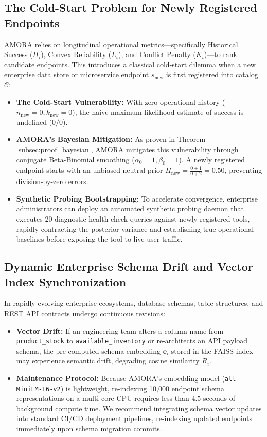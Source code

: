 \subsection{The Cold-Start Problem for Newly Registered Endpoints}
AMORA relies on longitudinal operational metrics---specifically Historical Success ($H_i$), Convex Reliability ($L_i$), and Conflict Penalty ($K_i$)---to rank candidate endpoints. This introduces a classical cold-start dilemma when a new enterprise data store or microservice endpoint $s_{\text{new}}$ is first registered into catalog $\mathcal{C}$:
\begin{itemize}
    \item \textbf{The Cold-Start Vulnerability:} With zero operational history ($n_{\text{new}} = 0, k_{\text{new}} = 0$), the naive maximum-likelihood estimate of success is undefined ($0/0$).
    \item \textbf{AMORA's Bayesian Mitigation:} As proven in Theorem \ref{subsec:proof_bayesian}, AMORA mitigates this vulnerability through conjugate Beta-Binomial smoothing ($\alpha_0 = 1, \beta_0 = 1$). A newly registered endpoint starts with an unbiased neutral prior $H_{\text{new}} = \frac{0 + 1}{0 + 2} = 0.50$, preventing division-by-zero errors.
    \item \textbf{Synthetic Probing Bootstrapping:} To accelerate convergence, enterprise administrators can deploy an automated synthetic probing daemon that executes 20 diagnostic health-check queries against newly registered tools, rapidly contracting the posterior variance and establishing true operational baselines before exposing the tool to live user traffic.
\end{itemize}

\subsection{Dynamic Enterprise Schema Drift and Vector Index Synchronization}
In rapidly evolving enterprise ecosystems, database schemas, table structures, and REST API contracts undergo continuous revisions:
\begin{itemize}
    \item \textbf{Vector Drift:} If an engineering team alters a column name from \texttt{product\_stock} to \texttt{available\_inventory} or re-architects an API payload schema, the pre-computed schema embedding $\mathbf{e}_i$ stored in the FAISS index may experience semantic drift, degrading cosine similarity $R_i$.
    \item \textbf{Maintenance Protocol:} Because AMORA's embedding model (\texttt{all-MiniLM-L6-v2}) is lightweight, re-indexing 10,000 endpoint schema representations on a multi-core CPU requires less than $4.5$ seconds of background compute time. We recommend integrating schema vector updates into standard CI/CD deployment pipelines, re-indexing updated endpoints immediately upon schema migration commits.
\end{itemize}

